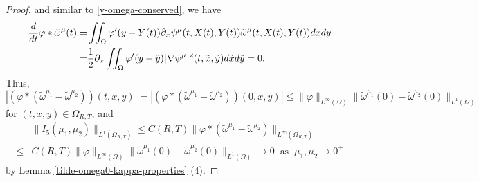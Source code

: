\documentclass[1 [leqno, 11pt]{amsart}
\numberwithin{equation}{section}
\begin{document}
\begin{CJK*}{GBK}{song}
\begin{appendix}
\begin{proof}
 and similar to \eqref{y-omega-conserved}, we have
\begin{align}\nonumber
{d\over dt}\varphi*\tilde \omega^\mu(t)=&\iint_{\Omega}\varphi'(y-Y(t))\partial_x\psi^\mu(t,X(t),Y(t))\tilde\omega^{\mu}(t,X(t),Y(t))  dxdy\\\nonumber
=&{1\over2}\partial_x\iint_{\Omega}\varphi'(y-\tilde y)|\nabla\psi^\mu|^2(t,\tilde x,\tilde y)  d\tilde xd\tilde y=0.
\end{align}
Thus, $|(\varphi*(\tilde\omega^{\mu_1}-\tilde\omega^{\mu_2}))(t,x,y)|=|(\varphi*(\tilde\omega^{\mu_1}-\tilde\omega^{\mu_2}))(0,x,y)|\leq \|\varphi\|_{L^\infty(\Omega)}\|\tilde\omega^{\mu_1}(0)-\tilde\omega^{\mu_2}(0)\|_{L^1(\Omega)}$ for $(t,x,y)\in\Omega_{R,T}$, and
\begin{align}\label{I5-estimate}
&\|I_5(\mu_1,\mu_2)\|_{L^1(\Omega_{R,T})}\leq C(R,T)\|\varphi*(\tilde\omega^{\mu_1}-\tilde\omega^{\mu_2})\|_{L^\infty(\Omega_{R,T})}\\\nonumber
\leq& C(R,T)\|\varphi\|_{L^\infty(\Omega)}\|\tilde\omega^{\mu_1}(0)-\tilde\omega^{\mu_2}(0)\|_{L^1(\Omega)}\to0 \;\;\text{as}\;\; \mu_1,\mu_2\to0^+
\end{align}
 by Lemma \ref{tilde-omega0-kappa-properties} (4).
 \fi


\end{proof}
\end{appendix}
\end{CJK*}
\end{document}
